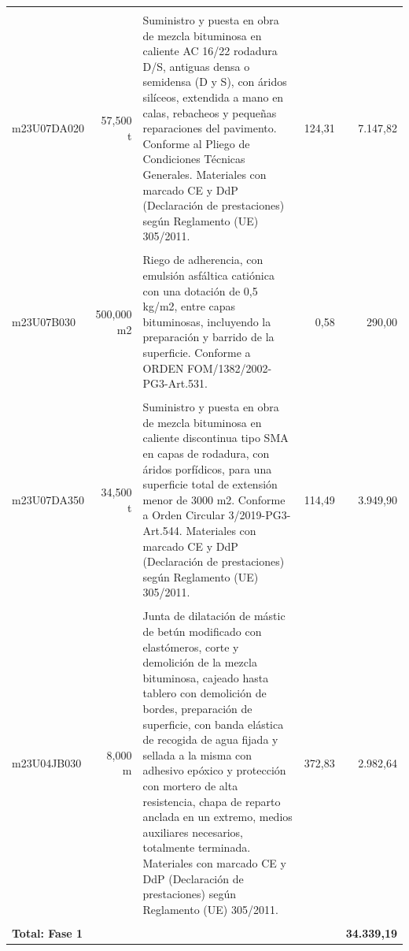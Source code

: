 \documentclass{book}%
\begin{document}
\begin{longtable}{lrlrr}
&&&&\\%
m23U07DA020&    57,500 t&\multicolumn{1}{p{5cm}}{Suministro y puesta en obra de mezcla bituminosa en caliente AC 16/22 rodadura D/S, antiguas densa o semidensa (D y S), con áridos silíceos, extendida a mano en calas, rebacheos y pequeñas reparaciones del pavimento. Conforme al Pliego de Condiciones Técnicas Generales. Materiales con marcado CE y DdP (Declaración de prestaciones) según Reglamento (UE) 305/2011.}&    124,31&7.147,82\\%
&&&&\\%
m23U07B030&   500,000 m2&\multicolumn{1}{p{5cm}}{Riego de adherencia, con emulsión asfáltica catiónica con una dotación de 0,5 kg/m2, entre capas bituminosas, incluyendo la preparación y barrido de la superficie. Conforme a ORDEN FOM/1382/2002{-}PG3{-}Art.531.}&      0,58&290,00\\%
&&&&\\%
m23U07DA350&    34,500 t&\multicolumn{1}{p{5cm}}{Suministro y puesta en obra de mezcla bituminosa en caliente discontinua tipo SMA en capas de rodadura, con áridos porfídicos, para una superficie total de extensión menor de 3000 m2. Conforme a Orden Circular 3/2019{-}PG3{-}Art.544. Materiales con marcado CE y DdP (Declaración de prestaciones) según Reglamento (UE) 305/2011.}&    114,49&3.949,90\\%
&&&&\\%
m23U04JB030&     8,000 m&\multicolumn{1}{p{5cm}}{Junta de dilatación de mástic de betún modificado con elastómeros, corte y demolición de la mezcla bituminosa, cajeado hasta tablero con demolición de bordes, preparación de superficie, con banda elástica de recogida de agua fijada y sellada a la misma con adhesivo epóxico y protección con mortero de alta resistencia, chapa de reparto anclada en un extremo, medios auxiliares necesarios, totalmente terminada. Materiales con marcado CE y DdP (Declaración de prestaciones) según Reglamento (UE) 305/2011.}&    372,83&2.982,64\\%
&&&&\\%
\multicolumn{4}{p{8cm}}{\textbf{Total: Fase 1}}&\textbf{34.339,19}\\%
\end{longtable}%
\normalsize

%
\end{document}
